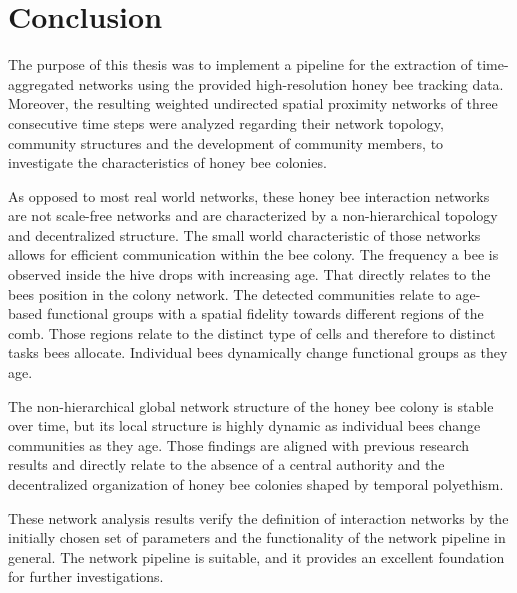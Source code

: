 \chapter{Conclusion}
\label{ch:conclusion}

The purpose of this thesis was to implement a pipeline for the extraction of time-aggregated networks using the provided high-resolution honey bee tracking data.
Moreover, the resulting weighted undirected spatial proximity networks of three consecutive time steps were analyzed regarding their network topology, community structures and the development of community members, to investigate the characteristics of honey bee colonies.

As opposed to most real world networks, these honey bee interaction networks are not scale-free networks and are characterized by a non-hierarchical topology and decentralized structure.
The small world characteristic of those networks allows for efficient communication within the bee colony.
The frequency a bee is observed inside the hive drops with increasing age.
That directly relates to the bees position in the colony network.
The detected communities relate to age-based functional groups with a spatial fidelity towards different regions of the comb. Those regions relate to the distinct type of cells and therefore to distinct tasks bees allocate.
Individual bees dynamically change functional groups as they age.

The non-hierarchical global network structure of the honey bee colony is stable over time, but its local structure is highly dynamic as individual bees change communities as they age. Those findings are aligned with previous research results and directly relate to the absence of a central authority and the decentralized organization of honey bee colonies shaped by temporal polyethism.

These network analysis results verify the definition of interaction networks by the initially chosen set of parameters and the functionality of the network pipeline in general.
The network pipeline is suitable, and it provides an excellent foundation for further investigations.

